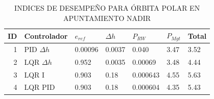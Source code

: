 \begin{table}[!h]
	\label{table:nadir_polar}
	\caption{\MakeUppercase{Indices de desempeño para órbita polar en apuntamiento Nadir}}
	\centering
	\begin{tabular}{r|lllll|l}
		\multicolumn{1}{l|}{\textbf{ID}} & \textbf{Controlador}                  & \mbox{\boldmath$e_{ref}$}   & \mbox{\boldmath$\Delta h$} & \mbox{\boldmath$P_{RW}$}   & \mbox{\boldmath$P_{Mgt}$}    & \textbf{Total}      \\ 
		\hline
		1                       & PID $\Delta h$ & 0.00096& 0.0037& 0.040 &3.47 &3.52  \\
		2                       & LQR $\Delta h$ & 0.952 &0.0035& 0.00069 &3.48 &4.44 \\
		3                       & LQR I          & 0.903& 0.18& 0.000643& 4.55& 5.63\\
		4                       & LQR PID        & 0.903 &0.18& 0.000604& 4.35 &5.43 \\
		\hline
	\end{tabular}
\end{table}
\clearpage

